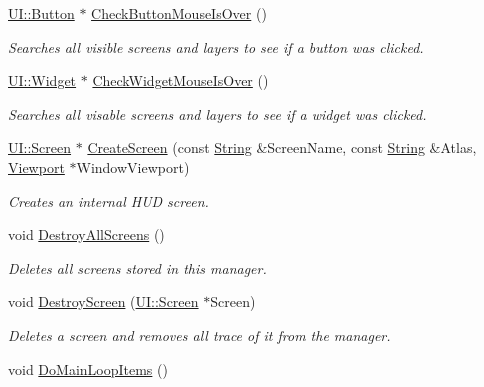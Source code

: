\begin{DoxyCompactItemize}
\hyperlink{classMezzanine_1_1UI_1_1Button}{UI::Button} $\ast$ \hyperlink{classMezzanine_1_1UIManager_ae4ad1d9ca321006a995c530a0debe835}{CheckButtonMouseIsOver} ()
\begin{DoxyCompactList}\small\item\em Searches all visible screens and layers to see if a button was clicked. \item\end{DoxyCompactList}\item 
\hyperlink{classMezzanine_1_1UI_1_1Widget}{UI::Widget} $\ast$ \hyperlink{classMezzanine_1_1UIManager_ab12c172934cb6836e97568266d973e50}{CheckWidgetMouseIsOver} ()
\begin{DoxyCompactList}\small\item\em Searches all visable screens and layers to see if a widget was clicked. \item\end{DoxyCompactList}\item 
\hyperlink{classMezzanine_1_1UI_1_1Screen}{UI::Screen} $\ast$ \hyperlink{classMezzanine_1_1UIManager_a1470d292a2ebea8438eddcc9abcf139f}{CreateScreen} (const \hyperlink{namespaceMezzanine_acf9fcc130e6ebf08e3d8491aebcf1c86}{String} \&ScreenName, const \hyperlink{namespaceMezzanine_acf9fcc130e6ebf08e3d8491aebcf1c86}{String} \&Atlas, \hyperlink{classMezzanine_1_1Viewport}{Viewport} $\ast$WindowViewport)
\begin{DoxyCompactList}\small\item\em Creates an internal HUD screen. \item\end{DoxyCompactList}\item 
\hypertarget{classMezzanine_1_1UIManager_a43e0ae42532e4c7a9d16ea46775be110}{
void \hyperlink{classMezzanine_1_1UIManager_a43e0ae42532e4c7a9d16ea46775be110}{DestroyAllScreens} ()}
\label{classMezzanine_1_1UIManager_a43e0ae42532e4c7a9d16ea46775be110}

\begin{DoxyCompactList}\small\item\em Deletes all screens stored in this manager. \item\end{DoxyCompactList}\item 
void \hyperlink{classMezzanine_1_1UIManager_a8634d75235a218f1b7c77a33fb2c4273}{DestroyScreen} (\hyperlink{classMezzanine_1_1UI_1_1Screen}{UI::Screen} $\ast$Screen)
\begin{DoxyCompactList}\small\item\em Deletes a screen and removes all trace of it from the manager. \item\end{DoxyCompactList}\item 
\hypertarget{classMezzanine_1_1UIManager_af774da651d30b4fe1ea086899c1961ca}{
void \hyperlink{classMezzanine_1_1UIManager_af774da651d30b4fe1ea086899c1961ca}{DoMainLoopItems} ()}
\label{classMezzanine_1_1UIManager_af774da651d30b4fe1ea086899c1961ca}


\end{DoxyCompactItemize}

